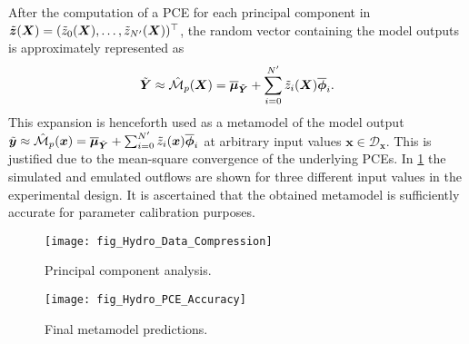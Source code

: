\par %
After the computation of a PCE for each principal component in \(\tilde{\bm{z}}(\bm{X}) = (\tilde{z}_0(\bm{X}),\ldots,\tilde{z}_{N^\prime}(\bm{X}))^\top\),
the random vector containing the model outputs is approximately represented as
\begin{equation} \label{eq:Hydro:VectorOutputPCE}
  \tilde{\bm{Y}} \approx \hat{\mathcal{M}}_p(\bm{X}) = \overline{\bm{\mu}}_{\tilde{\bm{Y}}} + \sum\limits_{i=0}^{N^\prime} \tilde{z}_i(\bm{X}) \overline{\bm{\phi}}_i.
\end{equation}
This expansion is henceforth used as a metamodel of the model output
\(\tilde{\bm{y}} \approx \hat{\mathcal{M}}_p(\bm{x}) = \overline{\bm{\mu}}_{\tilde{\bm{Y}}} + \sum_{i=0}^{N^\prime} \tilde{z}_i(\bm{x}) \overline{\bm{\phi}}_i\)
at arbitrary input values \(\bm{x} \in \mathcal{D}_{\bm{x}}\).
This is justified due to the mean-square convergence of the underlying PCEs.
In \cref{fig:Hydro:PCE:Accuracy} the simulated and emulated outflows are shown for three different input values in the experimental design.
It is ascertained that the obtained metamodel is sufficiently accurate for parameter calibration purposes.
\begin{figure}[htbp]
  \begin{minipage}[b]{\HYDROsubWidth}
    \centering
    \texttt{[image: fig\_Hydro\_Data\_Compression]}
    \caption[Principal component analysis]{Principal component analysis.}
    \label{fig:Hydro:Data:Compression}
  \end{minipage}%
  \hfill%
  \begin{minipage}[b]{\HYDROsubWidth}
    \centering
    \texttt{[image: fig\_Hydro\_PCE\_Accuracy]}
    \caption[Final metamodel predictions]{Final metamodel predictions.}
    \label{fig:Hydro:PCE:Accuracy}
  \end{minipage}%
\end{figure}